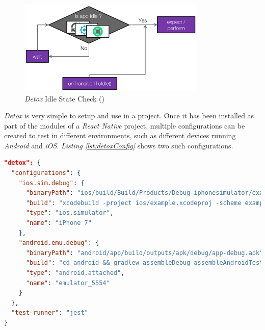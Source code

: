 \begin{figure}[H]
    \begin{center}
        \includegraphics[width=0.8\textwidth]{images/detox_check.png}
        \caption{\textit{Detox} Idle State Check (\cite{detox-gray-box})}
        \label{fig:detox_check}
    \end{center}
\end{figure}

\newpage

\textit{Detox} is very simple to setup and use in a project. Once it has been installed as part of the modules of a \textit{React Native} project, multiple configurations can be created to test in different environments, such as different devices running \textit{Android} and \textit{iOS}. \textit{Listing \ref{lst:detoxConfig}} shows two such configurations.

\begin{lstlisting}[language=json,caption=\textit{Detox} Configuration Example,label=lst:detoxConfig]
"detox": {
  "configurations": {
    "ios.sim.debug": {
      "binaryPath": "ios/build/Build/Products/Debug-iphonesimulator/example.app",
      "build": "xcodebuild -project ios/example.xcodeproj -scheme example -configuration Debug -sdk iphonesimulator -derivedDataPath ios/build",
      "type": "ios.simulator",
      "name": "iPhone 7"
    },
    "android.emu.debug": {
      "binaryPath": "android/app/build/outputs/apk/debug/app-debug.apk",
      "build": "cd android && gradlew assembleDebug assembleAndroidTest -DtestBuildType=debug && cd ..",
      "type": "android.attached",
      "name": "emulator_5554"
    }
  },
  "test-runner": "jest"
}
\end{lstlisting}

